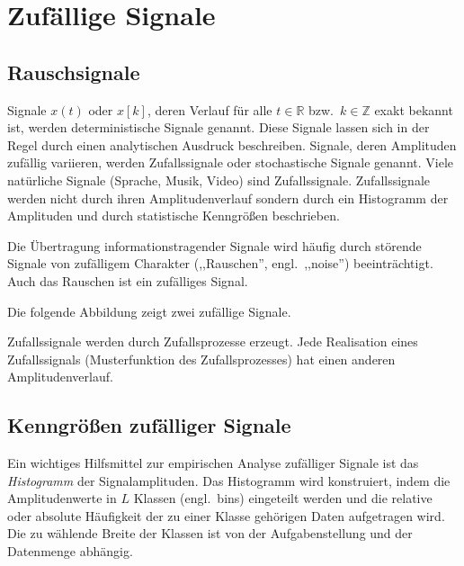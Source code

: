 \chapter{Zufällige Signale}
\label{chap:zufaellige-signale}

\section{Rauschsignale}
\label{sec:rauschsignale}

Signale $x(t)$ oder $x[k]$, deren Verlauf für alle $t \in \mathbb{R}$ bzw.\ $k \in \mathbb{Z}$ exakt bekannt ist, werden deterministische Signale genannt. Diese Signale lassen sich in der Regel durch einen analytischen Ausdruck beschreiben. Signale, deren Amplituden zufällig variieren, werden Zufallssignale oder stochastische Signale genannt. Viele natürliche Signale (Sprache, Musik, Video) sind Zufallssignale. Zufallssignale werden nicht durch ihren Amplitudenverlauf sondern durch ein Histogramm der Amplituden und durch statistische Kenngrößen beschrieben.

Die Übertragung informationstragender Signale wird häufig durch störende Signale von zufälligem Charakter (,,Rauschen'', engl.\ ,,noise'') beeinträchtigt. Auch das Rauschen ist ein zufälliges Signal.

\begin{beispiel}[Rauschen]
Die folgende Abbildung zeigt zwei zufällige Signale.

\end{beispiel}

Zufallssignale werden durch Zufallsprozesse erzeugt. Jede Realisation eines Zufallssignals (Musterfunktion des Zufallsprozesses) hat einen anderen Amplitudenverlauf.


\section{Kenngrößen zufälliger Signale}
\label{sec:kenngroessen-zufaellige-signale}

Ein wichtiges Hilfsmittel zur empirischen Analyse zufälliger Signale ist das \textit{Histogramm} der Signalamplituden. Das Histogramm wird konstruiert, indem die Amplitudenwerte in $L$ Klassen (engl.\ bins) eingeteilt werden und die relative oder absolute Häufigkeit der zu einer Klasse gehörigen Daten aufgetragen wird. Die zu wählende Breite der Klassen ist von der Aufgabenstellung und der Datenmenge abhängig.

